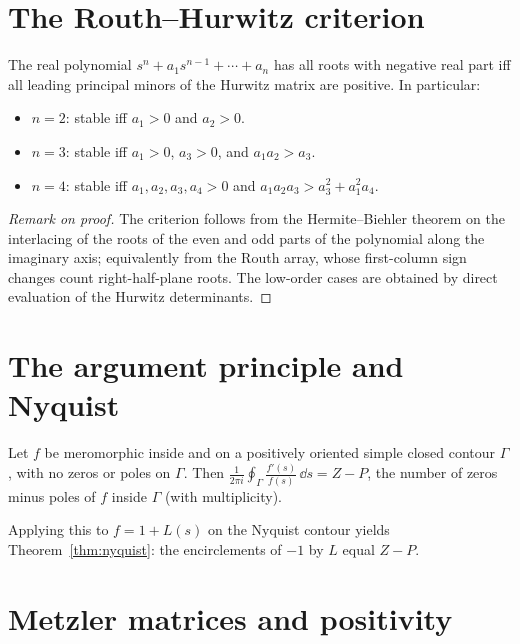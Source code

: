 \section{The Routh--Hurwitz criterion}

\begin{theorem}
The real polynomial $s^n+a_1s^{n-1}+\cdots+a_n$ has all roots with negative real
part iff all leading principal minors of the Hurwitz matrix are positive. In
particular:
\begin{itemize}[nosep]
\item $n=2$: stable iff $a_1>0$ and $a_2>0$.
\item $n=3$: stable iff $a_1>0$, $a_3>0$, and $a_1a_2>a_3$.
\item $n=4$: stable iff $a_1,a_2,a_3,a_4>0$ and $a_1a_2a_3>a_3^2+a_1^2a_4$.
\end{itemize}
\end{theorem}
\begin{proof}[Remark on proof]
The criterion follows from the Hermite--Biehler theorem on the interlacing of the
roots of the even and odd parts of the polynomial along the imaginary axis;
equivalently from the Routh array, whose first-column sign changes count
right-half-plane roots. The low-order cases are obtained by direct evaluation of
the Hurwitz determinants.
\end{proof}

\section{The argument principle and Nyquist}

\begin{theorem}
Let $f$ be meromorphic inside and on a positively oriented simple closed contour
$\Gamma$, with no zeros or poles on $\Gamma$. Then
$\frac{1}{2\pi i}\oint_\Gamma \frac{f'(s)}{f(s)}\,\dd s = Z-P$, the number of zeros
minus poles of $f$ inside $\Gamma$ (with multiplicity).
\end{theorem}
\noindent Applying this to $f=1+L(s)$ on the Nyquist contour yields
Theorem~\ref{thm:nyquist}: the encirclements of $-1$ by $L$ equal $Z-P$.

\section{Metzler matrices and positivity}

